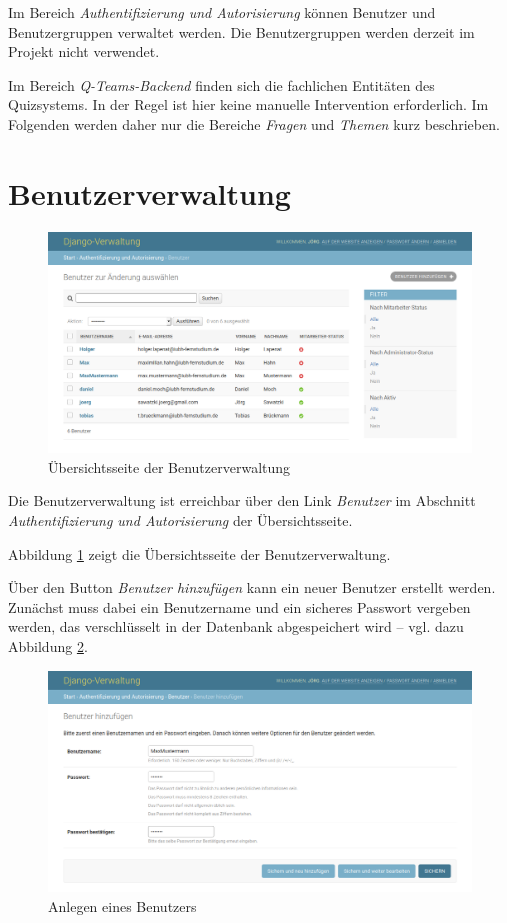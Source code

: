 \documentclass[a4paper,11pt,listof=numbered,glossary=totoc,parskip=half,toc=bib]{scrreprt}
\begin{document}
\begin{appendices}
	Im Bereich \textit{Authentifizierung und Autorisierung} können Benutzer und Benutzergruppen verwaltet werden. Die Benutzergruppen werden derzeit im Projekt nicht verwendet.
	
	Im Bereich \textit{Q-Teams-Backend} finden sich die fachlichen Entitäten des Quizsystems. In der Regel ist hier keine manuelle Intervention erforderlich. Im Folgenden werden daher nur die Bereiche \textit{Fragen} und \textit{Themen} kurz beschrieben. 
	
	\section{Benutzerverwaltung}
	
	\begin{figure}
		\centering
		\includegraphics[width=\textwidth]{benutzer}
		\caption{Übersichtsseite der Benutzerverwaltung}
		\label{fig:benutzer}
	\end{figure}
	
	Die Benutzerverwaltung ist erreichbar über den Link \textit{Benutzer} im Abschnitt \textit{Authentifizierung und Autorisierung} der Übersichtsseite.
	
	Abbildung \ref{fig:benutzer} zeigt die Übersichtsseite der Benutzerverwaltung.
	
	Über den Button \textit{Benutzer hinzufügen} kann ein neuer Benutzer erstellt werden. Zunächst muss dabei ein Benutzername und ein sicheres Passwort vergeben werden, das verschlüsselt in der Datenbank abgespeichert wird -- vgl. dazu Abbildung \ref{fig:neuerbenutzer}.
	
	\begin{figure}
		\centering
		\includegraphics[width=\textwidth]{neuerbenutzer}
		\caption{Anlegen eines Benutzers}
		\label{fig:neuerbenutzer}
	\end{figure}
	

\end{appendices}
\end{document}

